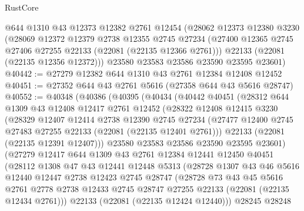 \begin{lexlean}{RustCore}
\begin{coremodule}
    @644
    @1310
    @43
    @12373
    @12382
    @2761
    @12454
    (@28062
      @12373
      @12380
      @3230
      (@28069
        @12372
        @12379
        @2738
        @12355
        @2745
        @27234
        (@27400 @12365 @2745 @27406 @27255 @22133 (@22081 (@22135 @12366 @2761)))
        @22133
        (@22081 (@22135 @12356 @12372)))
      @23580
      @23583
      @23586
      @23590
      @23595
      @23601)
@40442 := @27279 @12382 @644 @1310 @43 @2761 @12384 @12408 @12452
@40451 := @27352 @644 @43 @2761 @5616 (@27358 @644 @43 @5616 @28747)
@40552 := @40348
    (@40386
      (@40395
        (@40434
          (@40442
            @40451
            (@28312
              @644
              @1309
              @43
              @12408
              @12417
              @2761
              @12452
              (@28322
                @12408
                @12415
                @3230
                (@28329
                  @12407
                  @12414
                  @2738
                  @12390
                  @2745
                  @27234
                  (@27477 @12400 @2745 @27483 @27255 @22133 (@22081 (@22135 @12401 @2761)))
                  @22133
                  (@22081 (@22135 @12391 @12407)))
                @23580
                @23583
                @23586
                @23590
                @23595
                @23601)
              (@27279
                @12417
                @644
                @1309
                @43
                @2761
                @12384
                @12441
                @12450
                @40451
                (@28112
                  @1308
                  @47
                  @43
                  @12441
                  @12448
                  @5313
                  (@28728
                    @1307
                    @43
                    @46
                    @5616
                    @12440
                    @12447
                    @2738
                    @12423
                    @2745
                    @28747
                    (@28728
                      @73
                      @43
                      @45
                      @5616
                      @2761
                      @2778
                      @2738
                      @12433
                      @2745
                      @28747
                      @27255
                      @22133
                      (@22081 (@22135 @12434 @2761)))
                    @22133
                    (@22081 (@22135 @12424 @12440)))
                  @28245
                  @28248

\end{coremodule}
\end{lexlean}
